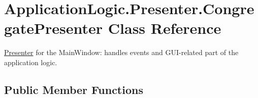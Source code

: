 \hypertarget{class_application_logic_1_1_presenter_1_1_congregate_presenter}{
\section{ApplicationLogic.Presenter.CongregatePresenter Class Reference}
\label{class_application_logic_1_1_presenter_1_1_congregate_presenter}
}


\hyperlink{namespace_application_logic_1_1_presenter}{Presenter} for the MainWindow: handles events and GUI-\/related part of the application logic.  


\subsection*{Public Member Functions}
